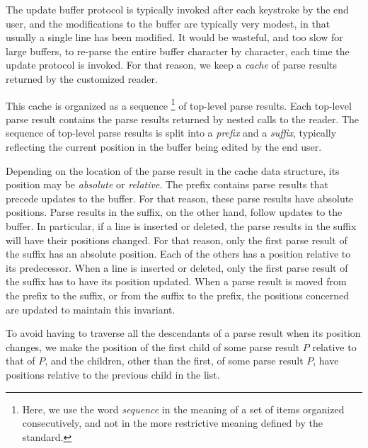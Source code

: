 The update buffer protocol is typically invoked after each keystroke
by the end user, and the modifications to the buffer are typically
very modest, in that usually a single line has been modified.  It
would be wasteful, and too slow for large buffers, to re-parse the
entire buffer character by character, each time the update protocol is
invoked.  For that reason, we keep a \emph{cache} of parse results
returned by the customized reader.

This cache is organized as a sequence%
\footnote{Here, we use the word \emph{sequence} in the meaning of a
  set of items organized consecutively, and not in the more
  restrictive meaning defined by the \commonlisp{} standard.}  of
top-level parse results.  Each top-level parse result contains the
parse results returned by nested calls to the reader.  The sequence of
top-level parse results is split into a \emph{prefix} and a
\emph{suffix}, typically reflecting the current position in the buffer
being edited by the end user.

Depending on the location of the parse result in the cache data
structure, its position may be \emph{absolute} or \emph{relative}.
The prefix contains parse results that precede updates to the buffer.
For that reason, these parse results have absolute positions.  Parse
results in the suffix, on the other hand, follow updates to the
buffer.  In particular, if a line is inserted or deleted, the parse
results in the suffix will have their positions changed.  For that
reason, only the first parse result of the suffix has an absolute
position.  Each of the others has a position relative to its
predecessor.  When a line is inserted or deleted, only the first parse
result of the suffix has to have its position updated.  When a parse
result is moved from the prefix to the suffix, or from the suffix to
the prefix, the positions concerned are updated to maintain this
invariant.

To avoid having to traverse all the descendants of a parse result when
its position changes, we make the position of the first child of some
parse result $P$ relative to that of $P$, and the children, other than
the first, of some parse result $P$, have positions relative to the
previous child in the list.
